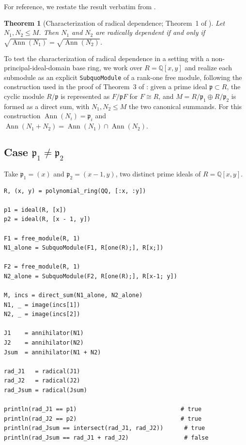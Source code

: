 \documentclass[11pt]{article}
\newtheorem{theorem}{Theorem}
\newcommand{\Ann}{\operatorname{Ann}}
\begin{document}
For reference, we restate the result verbatim from \cite{pekin-ozkaya-2026}.

\begin{theorem}[Characterization of radical dependence; Theorem~1 of \cite{pekin-ozkaya-2026}]
\label{thm:1}
Let $N_1,N_2\le M$. Then $N_1$ and $N_2$ are radically dependent if and
only if $\sqrt{\Ann(N_1)}=\sqrt{\Ann(N_2)}$.
\end{theorem}

To test the characterization of radical dependence in a setting with a
non-principal-ideal-domain base ring, we work over $R=\mathbb Q[x,y]$ and
realize each submodule as an explicit \texttt{SubquoModule} of a rank-one
free module, following the construction used in the proof of Theorem~3 of
\cite{pekin-ozkaya-2026}: given a prime ideal $\mathfrak p\subset R$, the
cyclic module $R/\mathfrak p$ is represented as $F/\mathfrak p F$ for
$F\cong R$, and $M = R/\mathfrak p_1 \oplus R/\mathfrak p_2$ is formed as
a direct sum, with $N_1,N_2\le M$ the two canonical summands. For this
construction $\operatorname{Ann}(N_i)=\mathfrak p_i$ and
$\operatorname{Ann}(N_1+N_2) = \operatorname{Ann}(N_1)\cap
\operatorname{Ann}(N_2)$.

\subsection{Case $\mathfrak p_1 \neq \mathfrak p_2$}

Take $\mathfrak p_1 = (x)$ and $\mathfrak p_2 = (x-1,y)$, two distinct
prime ideals of $R=\mathbb Q[x,y]$.

\begin{lstlisting}
R, (x, y) = polynomial_ring(QQ, [:x, :y])

p1 = ideal(R, [x])
p2 = ideal(R, [x - 1, y])

F1 = free_module(R, 1)
N1_alone = SubquoModule(F1, R[one(R);], R[x;])

F2 = free_module(R, 1)
N2_alone = SubquoModule(F2, R[one(R);], R[x-1; y])

M, incs = direct_sum(N1_alone, N2_alone)
N1, _ = image(incs[1])
N2, _ = image(incs[2])

J1    = annihilator(N1)
J2    = annihilator(N2)
Jsum  = annihilator(N1 + N2)

rad_J1   = radical(J1)
rad_J2   = radical(J2)
rad_Jsum = radical(Jsum)

println(rad_J1 == p1)                              # true
println(rad_J2 == p2)                              # true
println(rad_Jsum == intersect(rad_J1, rad_J2))      # true
println(rad_Jsum == rad_J1 + rad_J2)                # false
\end{lstlisting}
\end{document}

